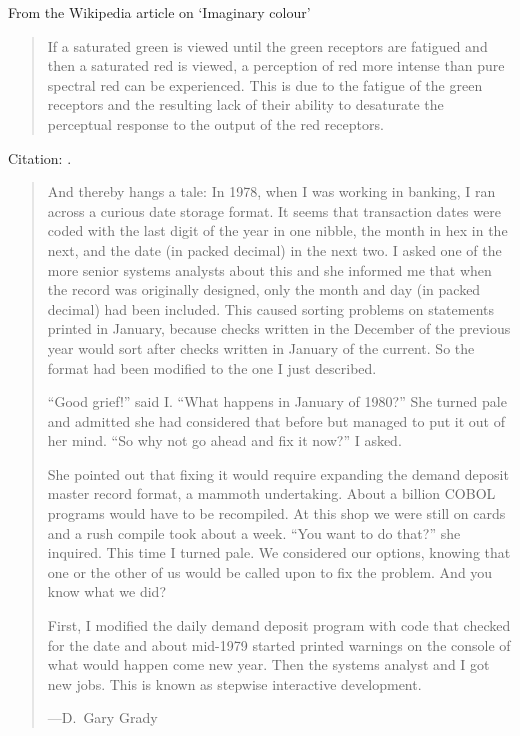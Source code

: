 \documentclass[a4paper]{article}
\begin{document}
\medskip
From the Wikipedia article on `Imaginary colour'
\begin{quote}
	If a saturated green is viewed until the green receptors are
	fatigued and then a saturated red is viewed, a perception of
	red more intense than pure spectral red can be experienced. This
	is due to the fatigue of the green receptors and the resulting
	lack of their ability to desaturate the perceptual response to
	the output of the red receptors.
\end{quote}
Citation: \citet[pp.\ 196--216]{Lindsay1972}.

\medskip
\begin{quote}
And thereby hangs a tale: In 1978, when I was working in banking, I ran
across a curious date storage format. It seems that transaction dates
were coded with the last digit of the year in one nibble, the month in
hex in the next, and the date (in packed decimal) in the next two. I
asked one of the more senior systems analysts about this and she informed
me that when the record was originally designed, only the month and day
(in packed decimal) had been included. This caused sorting problems on
statements printed in January, because checks written in the December
of the previous year would sort after checks written in January of the
current. So the format had been modified to the one I just described.

``Good grief!'' said I. ``What happens in January of 1980?'' She turned pale
and admitted she had considered that before but managed to put it out
of her mind. ``So why not go ahead and fix it now?'' I asked.

She pointed out that fixing it would require expanding the demand
deposit master record format, a mammoth undertaking. About a billion
COBOL programs would have to be recompiled. At this shop we were still on
cards and a rush compile took about a week. ``You want to do that?'' she
inquired. This time I turned pale. We considered our options, knowing
that one or the other of us would be called upon to fix the problem. And
you know what we did?

First, I modified the daily demand deposit program with code that checked
for the date and about mid-1979 started printed warnings on the console
of what would happen come new year. Then the systems analyst and I got
new jobs. This is known as stepwise interactive development.

---D.~Gary Grady~\citep{Grady1985}
\end{quote}
\end{document}
